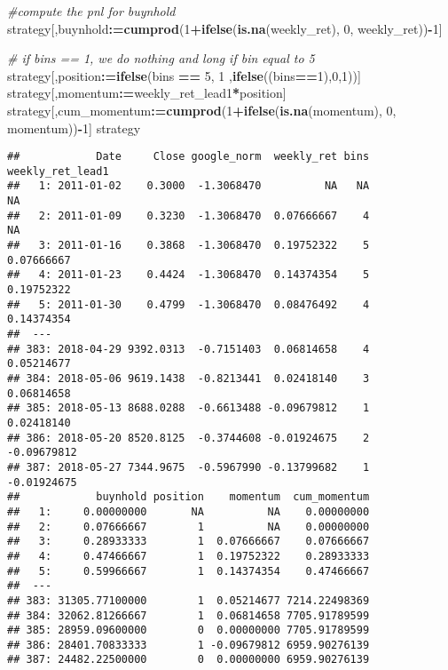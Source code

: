 \documentclass[
]{article}
\newenvironment{Shaded}{\begin{snugshade}}{\end{snugshade}}
\newcommand{\CommentTok}[1]{\textcolor[rgb]{0.56,0.35,0.01}{\textit{#1}}}
\newcommand{\DecValTok}[1]{\textcolor[rgb]{0.00,0.00,0.81}{#1}}
\newcommand{\ErrorTok}[1]{\textcolor[rgb]{0.64,0.00,0.00}{\textbf{#1}}}
\newcommand{\KeywordTok}[1]{\textcolor[rgb]{0.13,0.29,0.53}{\textbf{#1}}}
\newcommand{\NormalTok}[1]{#1}
\newcommand{\OperatorTok}[1]{\textcolor[rgb]{0.81,0.36,0.00}{\textbf{#1}}}
\newcommand{\StringTok}[1]{\textcolor[rgb]{0.31,0.60,0.02}{#1}}
\begin{document}
\begin{Shaded}
\begin{Highlighting}[]
\CommentTok{#compute the pnl for buynhold}
\NormalTok{strategy[,buynhold}\OperatorTok{:}\ErrorTok{=}\KeywordTok{cumprod}\NormalTok{(}\DecValTok{1}\OperatorTok{+}\KeywordTok{ifelse}\NormalTok{(}\KeywordTok{is.na}\NormalTok{(weekly_ret), }\DecValTok{0}\NormalTok{, weekly_ret))}\OperatorTok{-}\DecValTok{1}\NormalTok{]}

\CommentTok{# if bins == 1, we do nothing and long if bin equal to 5}
\NormalTok{strategy[,position}\OperatorTok{:}\ErrorTok{=}\KeywordTok{ifelse}\NormalTok{(bins }\OperatorTok{==}\StringTok{ }\DecValTok{5}\NormalTok{, }\DecValTok{1}\NormalTok{ ,}\KeywordTok{ifelse}\NormalTok{((bins}\OperatorTok{==}\DecValTok{1}\NormalTok{),}\DecValTok{0}\NormalTok{,}\DecValTok{1}\NormalTok{))]}
\NormalTok{strategy[,momentum}\OperatorTok{:}\ErrorTok{=}\NormalTok{weekly_ret_lead1}\OperatorTok{*}\NormalTok{position]}
\NormalTok{strategy[,cum_momentum}\OperatorTok{:}\ErrorTok{=}\KeywordTok{cumprod}\NormalTok{(}\DecValTok{1}\OperatorTok{+}\KeywordTok{ifelse}\NormalTok{(}\KeywordTok{is.na}\NormalTok{(momentum), }\DecValTok{0}\NormalTok{, momentum))}\OperatorTok{-}\DecValTok{1}\NormalTok{]}
\NormalTok{strategy}
\end{Highlighting}
\end{Shaded}

\begin{verbatim}
##            Date     Close google_norm  weekly_ret bins weekly_ret_lead1
##   1: 2011-01-02    0.3000  -1.3068470          NA   NA               NA
##   2: 2011-01-09    0.3230  -1.3068470  0.07666667    4               NA
##   3: 2011-01-16    0.3868  -1.3068470  0.19752322    5       0.07666667
##   4: 2011-01-23    0.4424  -1.3068470  0.14374354    5       0.19752322
##   5: 2011-01-30    0.4799  -1.3068470  0.08476492    4       0.14374354
##  ---                                                                   
## 383: 2018-04-29 9392.0313  -0.7151403  0.06814658    4       0.05214677
## 384: 2018-05-06 9619.1438  -0.8213441  0.02418140    3       0.06814658
## 385: 2018-05-13 8688.0288  -0.6613488 -0.09679812    1       0.02418140
## 386: 2018-05-20 8520.8125  -0.3744608 -0.01924675    2      -0.09679812
## 387: 2018-05-27 7344.9675  -0.5967990 -0.13799682    1      -0.01924675
##            buynhold position    momentum  cum_momentum
##   1:     0.00000000       NA          NA    0.00000000
##   2:     0.07666667        1          NA    0.00000000
##   3:     0.28933333        1  0.07666667    0.07666667
##   4:     0.47466667        1  0.19752322    0.28933333
##   5:     0.59966667        1  0.14374354    0.47466667
##  ---                                                  
## 383: 31305.77100000        1  0.05214677 7214.22498369
## 384: 32062.81266667        1  0.06814658 7705.91789599
## 385: 28959.09600000        0  0.00000000 7705.91789599
## 386: 28401.70833333        1 -0.09679812 6959.90276139
## 387: 24482.22500000        0  0.00000000 6959.90276139
\end{verbatim}
\end{document}

